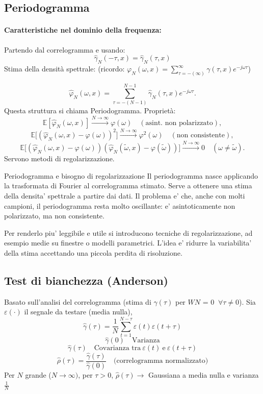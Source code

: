 \documentclass[11pt,a4paper]{article}
\begin{document}
\subsection{Periodogramma}
\paragraph{Caratteristiche nel dominio della frequenza:} 
Partendo dal correlogramma e usando:
\[
\hat\gamma_N(-\tau,x)=\hat\gamma_N(\tau,x)
\]
Stima della densità spettrale: (ricordo: $\varphi_N(\omega,x)=\sum_{\tau=-(\infty)}^{\infty}\gamma(\tau,x)e^{-j\omega\tau}$) 

\[
\hat\varphi_N(\omega,x)=\sum_{\tau=-(N-1)}^{N-1}\hat\gamma_N(\tau,x)e^{-j\omega\tau}.
\]
Questa struttura si chiama Periodogramma.
Proprietà:
\[
\mathbb{E}[\hat\varphi_N(\omega,x)]\xrightarrow{N\to\infty}\varphi(\omega)\quad(\text{asint.\ non polarizzato}),
\]
\[
\mathbb{E}\bigl[(\hat\varphi_N(\omega,x)-\varphi(\omega))^2\bigr]\xrightarrow{N\to\infty}\varphi^2(\omega)\quad(\text{non consistente}),
\]
\[
\mathbb{E}\bigl[(\hat\varphi_N(\omega,x)-\varphi(\omega))(\hat\varphi_N(\tilde\omega,x)-\varphi(\tilde\omega))\bigr]\xrightarrow{N\to\infty}0\quad(\omega\neq\tilde\omega).
\]
Servono metodi di regolarizzazione.

\begin{spiegazione}{Periodogramma e bisogno di regolarizzazione}
Il periodogramma nasce applicando la trasformata di Fourier al correlogramma stimato. Serve a ottenere una stima della densita' spettrale a partire dai dati. Il problema e' che, anche con molti campioni, il periodogramma resta molto oscillante: e' asintoticamente non polarizzato, ma non consistente.

Per renderlo piu' leggibile e utile si introducono tecniche di regolarizzazione, ad esempio medie su finestre o modelli parametrici. L'idea e' ridurre la variabilita' della stima accettando una piccola perdita di risoluzione.
\end{spiegazione}

\subsection{Test di bianchezza (Anderson)}
Basato sull'analisi del correlogramma (stima di $\gamma(\tau)$ per $WN$ = 0 $\ \forall\tau\neq0$). Sia $\varepsilon(\cdot)$ il segnale da testare (media nulla),
\[
\hat\gamma(\tau)=\frac{1}{N}\sum_{t=1}^{N-\tau}\varepsilon(t)\varepsilon(t+\tau)
\]
\[
\hat{\gamma}(0) \quad \text{Varianza}
\]
\[
\hat{\gamma}(\tau) \quad \text{Covarianza tra} \  \varepsilon(t) \ \text{e} \ \varepsilon(t+\tau)
\]
\[
\hat\rho(\tau)=\frac{\hat\gamma(\tau)}{\hat\gamma(0)}\quad\text{(correlogramma normalizzato)}
\]
Per $N$ grande ($N\to\infty)$, per $\tau>0$, $\hat\rho(\tau)\to$ Gaussiana a media nulla e varianza $\frac{1}{N}$ 
\end{document}
